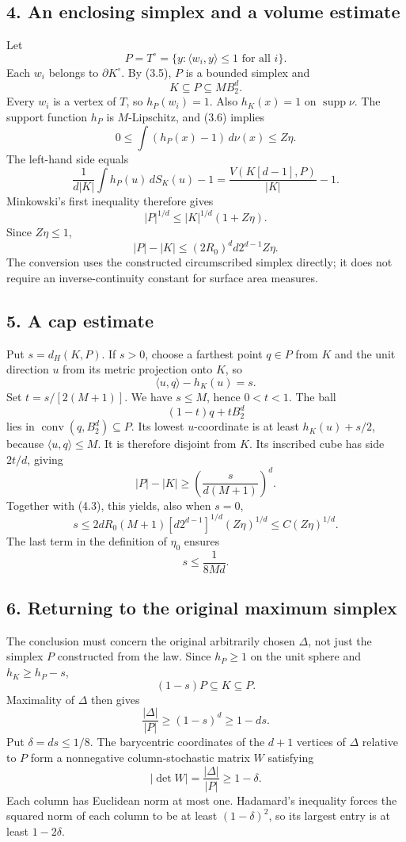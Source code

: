 \documentclass[
  11pt,
]{article}
\begin{document}
\subsection{4. An enclosing simplex and a volume
estimate}\label{an-enclosing-simplex-and-a-volume-estimate}

Let \[P=T^\circ=\{y:\langle w_i,y\rangle\le1\text{ for all }i\}.\] Each
\(w_i\) belongs to \(\partial K^\circ\). By (3.5), \(P\) is a bounded
simplex and \[K\subseteq P\subseteq MB_2^d.\tag{4.1}\] Every \(w_i\) is
a vertex of \(T\), so \(h_P(w_i)=1\). Also \(h_K(x)=1\) on
\(\operatorname{supp}\nu\). The support function \(h_P\) is
\(M\)-Lipschitz, and (3.6) implies
\[0\le\int(h_P(x)-1)\,d\nu(x)\le Z\eta.\tag{4.2}\] The left-hand side
equals \[\frac1{d|K|}\int h_P(u)\,dS_K(u)-1
=\frac{V(K[d-1],P)}{|K|}-1.\] Minkowski's first inequality therefore
gives \[|P|^{1/d}\le|K|^{1/d}(1+Z\eta).\] Since \(Z\eta\le1\),
\[|P|-|K|\le(2R_0)^d d2^{d-1}Z\eta.\tag{4.3}\] The conversion uses the
constructed circumscribed simplex directly; it does not require an
inverse-continuity constant for surface area measures.

\subsection{5. A cap estimate}\label{a-cap-estimate}

Put \(s=d_H(K,P)\). If \(s>0\), choose a farthest point \(q\in P\) from
\(K\) and the unit direction \(u\) from its metric projection onto
\(K\), so \[\langle u,q\rangle-h_K(u)=s.\] Set \(t=s/[2(M+1)]\). We have
\(s\le M\), hence \(0<t<1\). The ball \[ (1-t)q+tB_2^d\] lies in
\(\operatorname{conv}(q,B_2^d)\subseteq P\). Its lowest \(u\)-coordinate
is at least \(h_K(u)+s/2\), because \(\langle u,q\rangle\le M\). It is
therefore disjoint from \(K\). Its inscribed cube has side \(2t/d\),
giving \[|P|-|K|\ge\left(\frac{s}{d(M+1)}\right)^d.\] Together with
(4.3), this yields, also when \(s=0\),
\[s\le2dR_0(M+1)[d2^{d-1}]^{1/d}(Z\eta)^{1/d}
\le C(Z\eta)^{1/d}.\tag{5.1}\] The last term in the definition of
\(\eta_0\) ensures \[s\le\frac1{8Md}.\tag{5.2}\]

\subsection{6. Returning to the original maximum
simplex}\label{returning-to-the-original-maximum-simplex}

The conclusion must concern the original arbitrarily chosen \(\Delta\),
not just the simplex \(P\) constructed from the law. Since \(h_P\ge1\)
on the unit sphere and \(h_K\ge h_P-s\),
\[ (1-s)P\subseteq K\subseteq P.\] Maximality of \(\Delta\) then gives
\[\frac{|\Delta|}{|P|}\ge(1-s)^d\ge1-ds.\] Put \(\delta=ds\le1/8\). The
barycentric coordinates of the \(d+1\) vertices of \(\Delta\) relative
to \(P\) form a nonnegative column-stochastic matrix \(W\) satisfying
\[|\det W|=\frac{|\Delta|}{|P|}\ge1-\delta.\tag{6.1}\] Each column has
Euclidean norm at most one. Hadamard's inequality forces the squared
norm of each column to be at least \((1-\delta)^2\), so its largest
entry is at least \(1-2\delta\).
\end{document}
